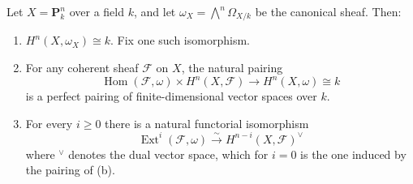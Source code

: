 Let $X = \mathbf{P}_k^n$ over a field $k$, and let $\omega_X = \bigwedge^n \Omega_{X/k}$ be the canonical sheaf. Then:
\begin{enumerate}
\item[(a)] $H^n(X, \omega_X) \cong k$. Fix one such isomorphism.
\item[(b)] For any coherent sheaf $\mathcal{F}$ on $X$, the natural pairing
$$\operatorname{Hom}(\mathcal{F}, \omega) \times H^n(X, \mathcal{F}) \to H^n(X, \omega) \cong k$$
is a perfect pairing of finite-dimensional vector spaces over $k$.
\item[(c)] For every $i \geq 0$ there is a natural functorial isomorphism
$$\operatorname{Ext}^i(\mathcal{F}, \omega) \xrightarrow{\sim} H^{n-i}(X, \mathcal{F})^\vee$$
where $^\vee$ denotes the dual vector space, which for $i = 0$ is the one induced by the pairing of (b).
\end{enumerate}
